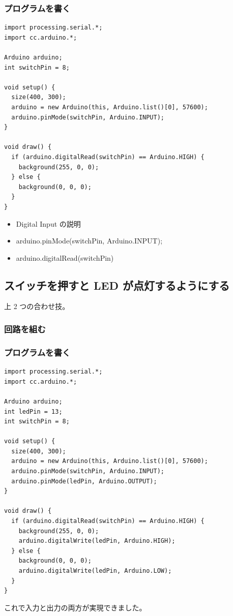 \documentclass[11pt,a4paper]{jarticle}
\begin{document}
\subsubsection*{プログラムを書く}
\begin{lstlisting}
import processing.serial.*;
import cc.arduino.*;

Arduino arduino;
int switchPin = 8;
 
void setup() {
  size(400, 300);
  arduino = new Arduino(this, Arduino.list()[0], 57600);
  arduino.pinMode(switchPin, Arduino.INPUT);  
}
 
void draw() {
  if (arduino.digitalRead(switchPin) == Arduino.HIGH) {
    background(255, 0, 0);
  } else {
    background(0, 0, 0);
  }
}
\end{lstlisting}

\begin{itemize}
 \item Digital Input の説明
 \item arduino.pinMode(switchPin, Arduino.INPUT);  
 \item arduino.digitalRead(switchPin)
\end{itemize}


\subsection*{スイッチを押すと LED が点灯するようにする}
上 2 つの合わせ技。

\subsubsection*{回路を組む}


\subsubsection*{プログラムを書く}
\begin{lstlisting}
import processing.serial.*;
import cc.arduino.*;

Arduino arduino;
int ledPin = 13;
int switchPin = 8;
 
void setup() {
  size(400, 300);
  arduino = new Arduino(this, Arduino.list()[0], 57600);
  arduino.pinMode(switchPin, Arduino.INPUT);
  arduino.pinMode(ledPin, Arduino.OUTPUT);
}
 
void draw() {
  if (arduino.digitalRead(switchPin) == Arduino.HIGH) {
    background(255, 0, 0);
    arduino.digitalWrite(ledPin, Arduino.HIGH);
  } else {
    background(0, 0, 0);
    arduino.digitalWrite(ledPin, Arduino.LOW);
  }
}
\end{lstlisting}

これで入力と出力の両方が実現できました。
\end{document}
